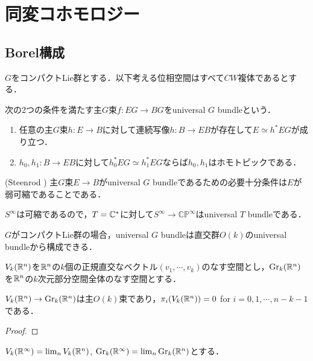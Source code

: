 \section{同変コホモロジー}
\subsection{Borel構成}

$G$をコンパクトLie群とする．以下考える位相空間はすべて$CW$複体であるとする．

\begin{defin}
  次の2つの条件を満たす主$G$束$f\colon EG\rightarrow BG$をuniversal $G$ bundleという．
  \begin{enumerate}
    \item 任意の主$G$束$h\colon E\rightarrow B$に対して連続写像$h\colon B\rightarrow EB$が存在して$E\simeq h^*EG$が成り立つ．
    \item $h_0,h_1\colon B\rightarrow EB$に対して$h_0^*EG\simeq h_1^*EG$ならば$h_0,h_1$はホモトピックである．
  \end{enumerate}
\end{defin}

\begin{theo}(Steenrod \cite{steenrod})
  主$G$束$E\rightarrow B$がuniversal $G$ bundleであるための必要十分条件は$E$が弱可縮であることである．
\end{theo}

\begin{eg}
  $S^\infty$は可縮であるので，$T=\mathbb{C}^*$に対して$S^\infty\rightarrow \mathbb{CP}^\infty$はuniversal $T$ bundleである．
\end{eg}

$G$がコンパクトLie群の場合，universal $G$ bundleは直交群$O(k)$のuniversal bundleから構成できる．

$V_k(\mathbb{R}^n)$を$\mathbb{R}^n$の$k$個の正規直交なベクトル$(v_1,\cdots,v_k)$のなす空間とし，$\text{Gr}_k(\mathbb{R}^n)$を$\mathbb{R}^n$の$k$次元部分空間全体のなす空間とする．

\begin{prop}
  $V_k(\mathbb{R}^n)\rightarrow \text{Gr}_k(\mathbb{R}^n)$は主$O(k)$束であり，$\pi_i(V_k(\mathbb{R}^n))=0$ for $i=0,1,\cdots,n-k-1$である．
\end{prop}

\begin{proof}
  
\end{proof}

$V_k(\mathbb{R}^\infty)=\lim_n V_k(\mathbb{R}^n)$, $\text{Gr}_k(\mathbb{R}^\infty)=\lim_n \text{Gr}_k(\mathbb{R}^n)$とする．

